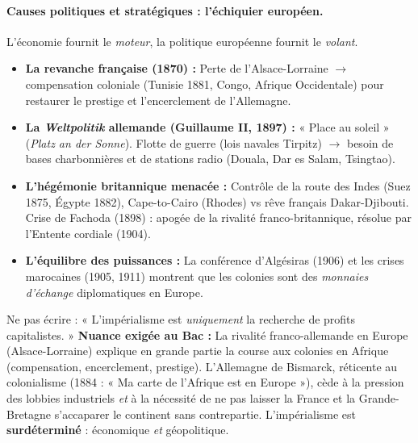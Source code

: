 \documentclass[11pt]{article}
\begin{document}
\paragraph{Causes politiques et stratégiques : l'échiquier européen.}
L'économie fournit le \emph{moteur}, la politique européenne fournit le \emph{volant}.
\begin{itemize}
    \item \textbf{La revanche française (1870) :} Perte de l'Alsace-Lorraine $\rightarrow$ compensation coloniale (Tunisie 1881, Congo, Afrique Occidentale) pour restaurer le prestige et l'encerclement de l'Allemagne.
    \item \textbf{La \emph{Weltpolitik} allemande (Guillaume II, 1897) :} « Place au soleil » (\emph{Platz an der Sonne}). Flotte de guerre (lois navales Tirpitz) $\rightarrow$ besoin de bases charbonnières et de stations radio (Douala, Dar es Salam, Tsingtao).
    \item \textbf{L'hégémonie britannique menacée :} Contrôle de la route des Indes (Suez 1875, Égypte 1882), Cape-to-Cairo (Rhodes) vs rêve français Dakar-Djibouti. Crise de Fachoda (1898) : apogée de la rivalité franco-britannique, résolue par l'Entente cordiale (1904).
    \item \textbf{L'équilibre des puissances :} La conférence d'Algésiras (1906) et les crises marocaines (1905, 1911) montrent que les colonies sont des \emph{monnaies d'échange} diplomatiques en Europe.
\end{itemize}

\begin{attention}
Ne pas écrire : « L'impérialisme est \emph{uniquement} la recherche de profits capitalistes. » \textbf{Nuance exigée au Bac :} La rivalité franco-allemande en Europe (Alsace-Lorraine) explique en grande partie la course aux colonies en Afrique (compensation, encerclement, prestige). L'Allemagne de Bismarck, réticente au colonialisme (1884 : « Ma carte de l'Afrique est en Europe »), cède à la pression des lobbies industriels \emph{et} à la nécessité de ne pas laisser la France et la Grande-Bretagne s'accaparer le continent sans contrepartie. L'impérialisme est \textbf{surdéterminé} : économique \emph{et} géopolitique.
\end{attention}
\end{document}
